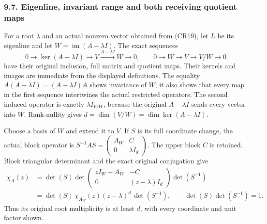 \documentclass[
  11pt,
]{article}
\begin{document}
\subsubsection{9.7. Eigenline, invariant range and both receiving
quotient
maps}\label{eigenline-invariant-range-and-both-receiving-quotient-maps}

For a root \(\lambda\) and an actual nonzero vector obtained from
(CR19), let \(L\) be its eigenline and let
\(W=\operatorname{im}(A-\lambda I)\). The exact sequences \[
 0\longrightarrow\ker(A-\lambda I)\longrightarrow V
     \xrightarrow{A-\lambda I}W\longrightarrow0,\qquad
 0\longrightarrow W\longrightarrow V
     \longrightarrow V/W\longrightarrow0                    \tag{CR20}
\] have their original inclusion, full matrix and quotient maps. Their
kernels and images are immediate from the displayed definitions. The
equality \(A(A-\lambda I)=(A-\lambda I)A\) shows invariance of \(W\); it
also shows that every map in the first sequence intertwines the actual
restricted operators. The second induced operator is exactly
\(\lambda I_{V/W}\), because the original \(A-\lambda I\) sends every
vector into \(W\). Rank-nullity gives
\(d=\dim(V/W)=\dim\ker(A-\lambda I)\).

Choose a basis of \(W\) and extend it to \(V\). If \(S\) is its full
coordinate change, the actual block operator is
\(S^{-1}AS=\begin{pmatrix}A_W&C\\0&\lambda I_d\end{pmatrix}\). The upper
block \(C\) is retained. Block triangular determinant and the exact
original conjugation give \[
 \begin{split}
 \chi_A(z)
 &=\det(S)\det\begin{pmatrix}zI_W-A_W&-C\\0&(z-\lambda)I_d\end{pmatrix}
                                                   \det(S^{-1})\\
 &=\det(S)\,\chi_{A_W}(z)(z-\lambda)^d\,\det(S^{-1}),\qquad
                    \det(S)\det(S^{-1})=1 .                  
 \end{split} \tag{CR21}
\] Thus its original root multiplicity is at least \(d\), with every
coordinate and unit factor shown.
\end{document}
